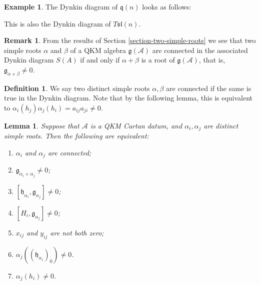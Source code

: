 \documentclass[12pt, a4paper, reqno]{amsart}
\def\AA{\mathcal{A}}
\def\q{\mathfrak{q}}
\def\g{\mathfrak{g}}
\def\h{\mathfrak{h}}
\def\l{\mathfrak{l}}
\def\s{\mathfrak{s}}
\def\ol{\overline}
\newtheorem{lemma}{Lemma}
\theoremstyle{definition}
\newtheorem{definition}{Definition}
\theoremstyle{definition}
\newtheorem{remark}{Remark}
\theoremstyle{definition}
\newtheorem{example}{Example}}
\numberwithin{theorem}{section}
\numberwithin{lemma}{section}
\numberwithin{remark}{section}
\numberwithin{definition}{section}
\numberwithin{corollary}{section}
\numberwithin{proposition}{section}
\numberwithin{example}{section}
\begin{document}
	\begin{example}
		The Dynkin diagram of $\q(n)$ looks as follows:
		\begin{center}
		\end{center}
		This is also the Dynkin diagram of $T\s\l(n)$.
	\end{example}
	
	\begin{remark}
		From the results of Section \ref{section-two-simple-roots} we see that two simple roots \(\alpha\) and \(\beta\) of a QKM algebra \(\mathfrak{g}(\mathcal{A})\) are connected in the associated Dynkin diagram \(S(A)\) if and only if \(\alpha+\beta\) is a root of \(\mathfrak{g}(\mathcal{A})\), that is, \(\mathfrak{g}_{\alpha+\beta}\neq 0\).
	\end{remark}
	
	\begin{definition}
		We say two distinct simple roots $\alpha,\beta$ are connected if the same is true in the Dynkin diagram.  Note that by the following lemma, this is equivalent to $\alpha_i(h_j)\alpha_j(h_i)=a_{ij}a_{ji}\neq0$.
	\end{definition}
	
		\begin{lemma}\label{lemma-QKM-notation}
		Suppose that $\AA$ is a QKM Cartan datum, and $\alpha_i,\alpha_j$ are distinct simple roots.  Then the following are equivalent:
		\begin{enumerate}
			\item $\alpha_i$ and $\alpha_j$ are connected;
			\item $\g_{\alpha_i+\alpha_j}\neq0$;
			\item $[\h_{\alpha_i},\g_{\alpha_j}]\neq0$;
			\item $[H_i,\g_{\alpha_j}]\neq0$;
			\item $x_{ij}$ and $y_{ij}$ are not both zero;
			\item $\alpha_j((\h_{\alpha_i})_{\ol{0}})\neq0$.
			\item $\alpha_{j}(h_i)\neq0$.
		\end{enumerate}
	\end{lemma}
	
\end{document}
